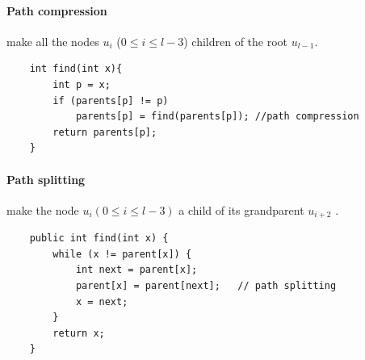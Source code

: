 \documentclass{article}
\begin{document}
\paragraph{Path compression}  make all the nodes $u_i$ ($ 0 \leq i \leq l-3$) children of the root $u_{l-1}$\cite{hopcroft1973set}.
\begin{lstlisting}
    int find(int x){
        int p = x;
        if (parents[p] != p)
            parents[p] = find(parents[p]); //path compression
        return parents[p];
    }
\end{lstlisting}
\paragraph{Path splitting}  make the node $u_i (0 \leq i \leq l-3)$ a child of its grandparent $u_{i+2}$\cite{van1977alternative} \cite{van1980datastructures}. 
\begin{lstlisting}
    public int find(int x) {
        while (x != parent[x]) {
            int next = parent[x];
            parent[x] = parent[next];   // path splitting
            x = next;
        }
        return x;
    }
\end{lstlisting}
\end{document}
